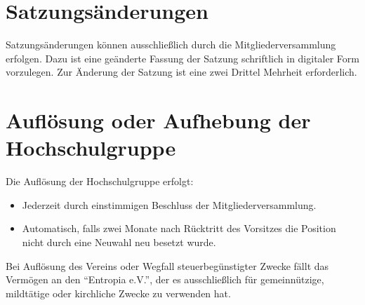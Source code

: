\documentclass[11pt]{article}
\begin{document}
\section{Satzungsänderungen}
Satzungsänderungen können ausschließlich durch die Mitgliederversammlung erfolgen. Dazu ist eine geänderte Fassung der Satzung schriftlich in digitaler Form vorzulegen. Zur Änderung der Satzung ist eine zwei Drittel Mehrheit erforderlich.
\section{Auflösung oder Aufhebung der Hochschulgruppe}
Die Auflösung der Hochschulgruppe erfolgt:
\begin{itemize}
	\item Jederzeit durch einstimmigen Beschluss der Mitgliederversammlung.
	\item Automatisch, falls zwei Monate nach Rücktritt des Vorsitzes die Position nicht durch eine Neuwahl neu besetzt wurde.
\end{itemize}
Bei Auflösung des Vereins oder Wegfall steuerbegünstigter Zwecke fällt das Vermögen an den ``Entropia e.V.'', der es ausschließlich für gemeinnützige,
mildtätige oder kirchliche Zwecke zu verwenden hat.
\end{document}
